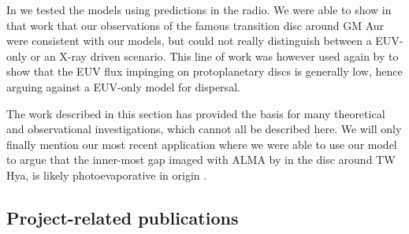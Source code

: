 \documentclass[10pt,fleqn,twoside]{article}
\begin{document}
In 
\citet{2013MNRAS.434.3378O}
we tested the models using
predictions in the radio. We were able to show in that work that our
observations of the famous transition disc around GM Aur were
consistent with our models, but could not really distinguish between
a EUV-only or an X-ray driven scenario. This line of work was however
used again by 
\citet{2014ApJ...795....1P}
to show that the EUV flux
impinging on protoplanetary discs is generally low, hence arguing
against a EUV-only model for dispersal. 

The work described in this section has provided the basis for many theoretical
and observational investigations, which cannot all be described
here. We will only finally mention our most recent application where
we were able to use our model to argue that the inner-most gap imaged
with ALMA by 
\citet{2016ApJ...820L..40A}
in the disc around TW Hya, is
likely photoevaporative in origin 
\citep{2017MNRAS.464L..95E}.


\subsection{Project-related publications}


\end{document}

